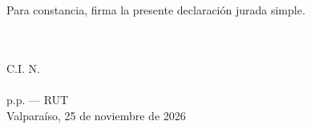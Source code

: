 \documentclass[11pt]{article}
\begin{document}
\noindent Para constancia, firma la presente declaración jurada simple.

\vspace{14pt}
\begin{center}
  \SIMfirmalinea{7cm}{0.5pt}\\
  \textbf{\LFXrepresentante}\\
  C.I. N.\textdegree~\SIMrunrepresentante\\
  \LFXcargo\\
  p.p. \LFXempresa{} --- RUT \LFXrut\\
  Valparaíso, 25 de noviembre de 2026
\end{center}
\end{document}
